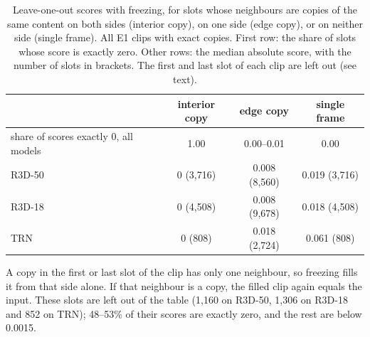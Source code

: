\begin{table}[h]
\centering
\caption{Leave-one-out scores with freezing, for slots whose neighbours are copies of the same content on both sides (interior copy), on one side (edge copy), or on neither side (single frame). All E1 clips with exact copies. First row: the share of slots whose score is exactly zero. Other rows: the median absolute score, with the number of slots in brackets. The first and last slot of each clip are left out (see text).}
\label{tab:loo-freeze}
\begin{tabular}{lccc}
\toprule
 & interior copy & edge copy & single frame \\
\midrule
share of scores exactly 0, all models & 1.00 & 0.00--0.01 & 0.00 \\
R3D-50 & 0 (3{,}716) & 0.008 (8{,}560) & 0.019 (3{,}716) \\
R3D-18 & 0 (4{,}508) & 0.008 (9{,}678) & 0.018 (4{,}508) \\
TRN & 0 (808) & 0.018 (2{,}724) & 0.061 (808) \\
\bottomrule
\end{tabular}
\end{table}
A copy in the first or last slot of the clip has only one neighbour, so freezing fills it from that side alone.
If that neighbour is a copy, the filled clip again equals the input.
These slots are left out of the table (1{,}160 on R3D-50, 1{,}306 on R3D-18 and 852 on TRN); 48--53\% of their scores are exactly zero, and the rest are below 0.0015.

